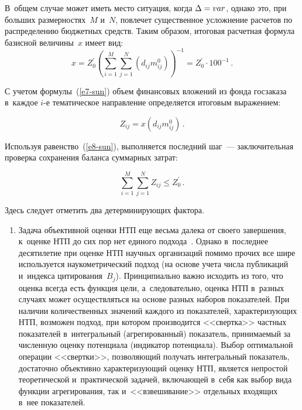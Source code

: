 \begin{multicols}{2}
 В~общем случае может иметь место ситуация, когда $\Delta 
\hm = var$, однако это, при больших размерностях~$M$ и~$N$, повлечет 
существенное услож\-не\-ние рас\-че\-тов по распределению бюджетных средств. 
Таким образом, итоговая расчетная формула базисной величины~$x$ имеет вид: 
\begin{equation}
x=Z_0^\prime \left(\sum\limits_{i=1}^M \sum\limits_{j=1}^N(d_{ij} 
m_{ij}^0)\right)^{-1} =Z_0^\prime\cdot 100^{-1}\,.
\label{e7-sun}
\end{equation}
    
    С учетом формулы~(\ref{e7-sun}) объем финансовых вложений из фонда 
госзаказа в~каждое $i$-е тематическое на\-прав\-ле\-ние определяется итоговым 
выражением:

\vspace*{3pt}

\noindent
    \begin{equation}
    Z_{ij}= x \left( d_{ij} m^0_{ij}\right)\,.
    \label{e8-sun}
    \end{equation}
    
    Используя равенство~(\ref{e8-sun}), выполняется последний шаг~--- 
заключительная проверка сохранения баланса суммарных затрат:

\vspace*{3pt}

\noindent
    \begin{equation*}
    \sum\limits_{i=1}^M \sum\limits_{j=1}^N Z_{ij}\leq Z_0^\prime\,.
    \end{equation*}
    
    \vspace*{-2pt}
    
    \noindent
     Здесь следует отметить два детерминирующих фактора. 
\begin{enumerate}[1.]
\item Задача объективной оценки 
НТП еще весьма далека от своего завершения, к~оценке НТП до сих пор 
нет единого подхода~\cite{10-sun}. Однако в~последнее десятилетие при оценке 
НТП научных организаций помимо прочих все шире используется 
наукометрический подход (на основе учета числа пуб\-ли\-ка\-ций и~индекса
цитирования~$B_j$). Принципиально важно исходить из того, что оценка всегда есть 
функция цели, а~следовательно, оценка НТП в~разных случаях может 
осуществляться на основе разных наборов показателей. При наличии 
количественных значений каж\-до\-го из показателей, характеризующих НТП, 
возможен подход, при котором производится <<свертка>> част\-ных показателей 
в~интегральный (агрегированный) показатель,\linebreak
 принимаемый за численную 
оценку потенциала (индикатор потенциала). Выбор оптимальной операции 
<<свертки>>, позволяющий получать интегральный показатель, достаточно\linebreak 
объективно ха\-рак\-те\-ри\-зу\-ющий оценку НТП, является непростой теоретической 
и~практической задачей, включающей в~себя как выбор вида функции 
агрегирования, так и~<<взвешивание>> отдельных входящих в~нее 
показателей.\\[-14pt] 
    

\end{enumerate}
\end{multicols}

